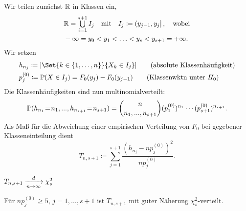 \documentclass{cheat-sheet}
\renewcommand{\P}{\mathbb{P}} %
\begin{document}
\begin{verf}
  Wir teilen zunächst $\mathbb{R}$ in Klassen ein,
  \begin{align*}
    & \R = \bigcup_{i=1}^{s+1} I_j
    \quad \text{mit} \quad
    I_j \coloneqq \ocinterval{y_{j-1}}{y_j},
    \quad
    \text{wobei} \\
    & - \infty = y_0 < y_1 < \ldots < y_s < y_{s+1} = + \infty.
  \end{align*}
  Wir setzen
  \begin{align*}
    & h_{n_j} \coloneqq \abs{\Set{k \in \{ 1, \ldots, n \}}{X_k \in I_j}} \tag{absolute Klassenhäufigkeit} \\
    & p_j^{(0)} \coloneqq \P(X \in I_j) = F_0(y_j) - F_0(y_{j-1}) \tag{Klassenwktn unter $H_0$}
  \end{align*}
  Die Klassenhäufigkeiten sind nun multinomialverteilt:
  \[ \P(h_{n_1} \!=\! n_1, \nldots, h_{n_{s+1}} \!=\! n_{s+1}) = {n \choose n_1, \nldots, n_{s+1}} (p_1^{(0)})^{n_1} \cdots (p_{s+1}^{(0)})^{n_{s+1}}. \]
  Als Maß für die Abweichung einer empirischen Verteilung von $F_0$ bei gegebener Klasseneinteilung dient
  \[ T_{n,s+1} \coloneqq \sum_{j=1}^{s+1} \frac{(h_{n_j} - n p_j^{(0)})^2}{n p_j^{(0)}}. \]
\end{verf}

\begin{satz}
  $T_{n,s+1} \xrightarrow[n \to \infty]{d} \chi_s^2$
\end{satz}

\begin{faustregel}
  Für $n p_j^{(0)} \geq 5$, $j = 1, \ldots, s+1$ ist $T_{n,s+1}$ mit guter Näherung $\chi_s^2$-verteilt.
\end{faustregel}
\end{document}
